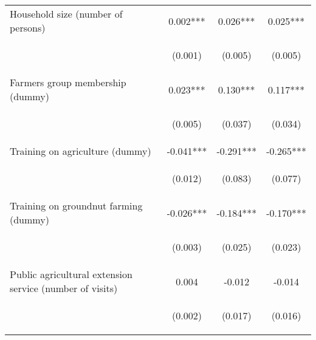 \begin{center}
\begin{tabular}{lccc}
Household size (number of persons) & 0.002*** & 0.026*** & 0.025*** \\
\vspace{4pt} & \begin{footnotesize}(0.001)\end{footnotesize} & \begin{footnotesize}(0.005)\end{footnotesize} & \begin{footnotesize}(0.005)\end{footnotesize} \\
Farmers group membership (dummy) & 0.023*** & 0.130*** & 0.117*** \\
\vspace{4pt} & \begin{footnotesize}(0.005)\end{footnotesize} & \begin{footnotesize}(0.037)\end{footnotesize} & \begin{footnotesize}(0.034)\end{footnotesize} \\
Training on agriculture (dummy) & -0.041*** & -0.291*** & -0.265*** \\
\vspace{4pt} & \begin{footnotesize}(0.012)\end{footnotesize} & \begin{footnotesize}(0.083)\end{footnotesize} & \begin{footnotesize}(0.077)\end{footnotesize} \\
Training on groundnut farming (dummy) & -0.026*** & -0.184*** & -0.170*** \\
\vspace{4pt} & \begin{footnotesize}(0.003)\end{footnotesize} & \begin{footnotesize}(0.025)\end{footnotesize} & \begin{footnotesize}(0.023)\end{footnotesize} \\
Public agricultural extension service (number of visits) & 0.004 & -0.012 & -0.014 \\
\vspace{4pt} & \begin{footnotesize}(0.002)\end{footnotesize} & \begin{footnotesize}(0.017)\end{footnotesize} & \begin{footnotesize}(0.016)\end{footnotesize} \\

\end{tabular}
\end{center}
